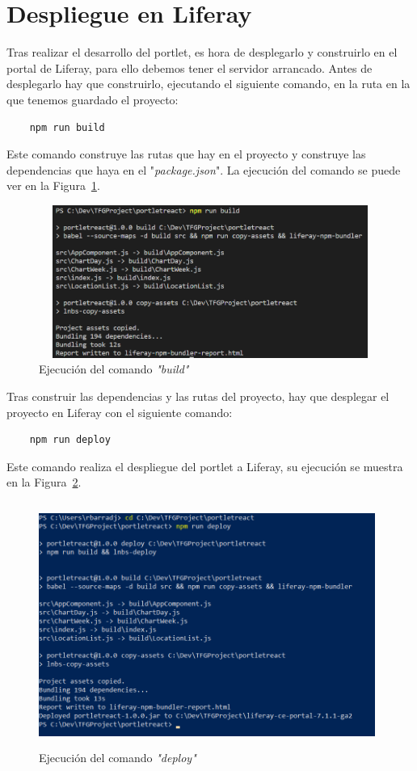 \documentclass[a4paper, 12pt]{book}
\begin{document}
\section{Despliegue en Liferay} 
\label{sec:despliegue-liferay}
Tras realizar el desarrollo del portlet, es hora de desplegarlo y construirlo en el portal de Liferay, para ello debemos tener el servidor arrancado. Antes de desplegarlo hay que construirlo, ejecutando el siguiente comando, en la ruta en la que tenemos guardado el proyecto:
\begin{verbatim}
    npm run build
\end{verbatim} 
Este comando construye las rutas que hay en el proyecto y construye las dependencias que haya en el "\textit{package.json}". La ejecución del comando se puede ver en la Figura~\ref{fig:npm_build}.
\begin{figure}[h]
  \centering
  \includegraphics[width=12cm, height=5cm]{img_usadas/npm_build.png}
  \caption{Ejecución del comando \textit{"build"}}
  \label{fig:npm_build}
\end{figure}

Tras construir las dependencias y las rutas del proyecto, hay que desplegar el proyecto en Liferay con el siguiente comando: 
\begin{verbatim}
    npm run deploy
\end{verbatim}
Este comando realiza el despliegue del portlet a Liferay, su ejecución se muestra en la Figura~\ref{fig:deploy}.
\begin{figure}[h]
  \centering
  \includegraphics[width=11cm, height=8cm]{img_usadas/deploy.png}
  \caption{Ejecución del comando \textit{"deploy"}}
  \label{fig:deploy}
\end{figure}
\end{document}
